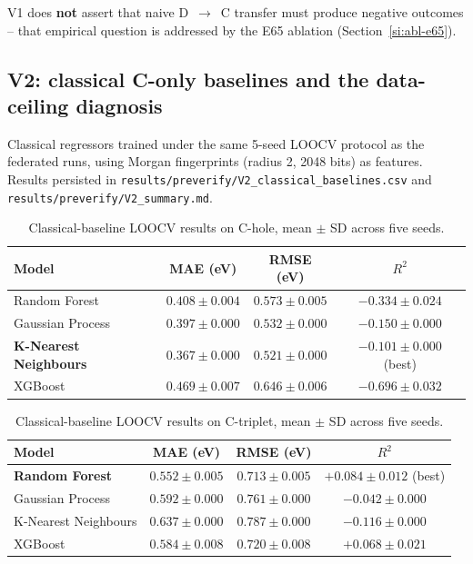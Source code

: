 \documentclass[11pt,a4paper]{article}
\begin{document}
V1 does \textbf{not} assert that naive D~$\to$~C transfer must produce negative outcomes -- that empirical question is addressed by the E65 ablation (Section~\ref{si:abl-e65}).

\subsection{V2: classical C-only baselines and the data-ceiling diagnosis}\label{si:v2}

Classical regressors trained under the same 5-seed LOOCV protocol as the federated runs, using Morgan fingerprints (radius 2, 2048 bits) as features. Results persisted in \texttt{results/preverify/V2\_classical\_baselines.csv} and \texttt{results/preverify/V2\_summary.md}.

\begin{table}[h]
\centering
\small
\caption{Classical-baseline LOOCV results on C-hole, mean $\pm$ SD across five seeds.}\label{tab:si:v2-hole}
\begin{tabular}{@{}lccc@{}}
\toprule
Model & MAE (eV) & RMSE (eV) & $R^2$ \\
\midrule
Random Forest             & $0.408 \pm 0.004$ & $0.573 \pm 0.005$ & $-0.334 \pm 0.024$ \\
Gaussian Process          & $0.397 \pm 0.000$ & $0.532 \pm 0.000$ & $-0.150 \pm 0.000$ \\
\textbf{K-Nearest Neighbours} & $\mathbf{0.367 \pm 0.000}$ & $\mathbf{0.521 \pm 0.000}$ & $\mathbf{-0.101 \pm 0.000}$ (best) \\
XGBoost                   & $0.469 \pm 0.007$ & $0.646 \pm 0.006$ & $-0.696 \pm 0.032$ \\
\bottomrule
\end{tabular}
\end{table}

\begin{table}[h]
\centering
\small
\caption{Classical-baseline LOOCV results on C-triplet, mean $\pm$ SD across five seeds.}\label{tab:si:v2-triplet}
\begin{tabular}{@{}lccc@{}}
\toprule
Model & MAE (eV) & RMSE (eV) & $R^2$ \\
\midrule
\textbf{Random Forest}    & $\mathbf{0.552 \pm 0.005}$ & $\mathbf{0.713 \pm 0.005}$ & $\mathbf{+0.084 \pm 0.012}$ (best) \\
Gaussian Process          & $0.592 \pm 0.000$ & $0.761 \pm 0.000$ & $-0.042 \pm 0.000$ \\
K-Nearest Neighbours      & $0.637 \pm 0.000$ & $0.787 \pm 0.000$ & $-0.116 \pm 0.000$ \\
XGBoost                   & $0.584 \pm 0.008$ & $0.720 \pm 0.008$ & $+0.068 \pm 0.021$ \\
\bottomrule
\end{tabular}
\end{table}
\end{document}
